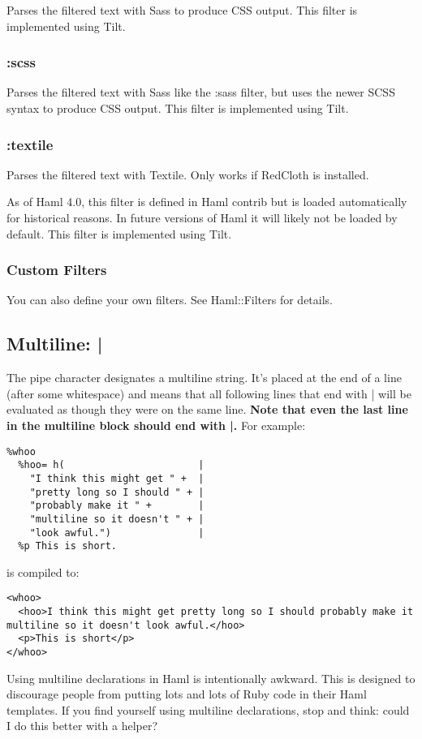 \documentclass[10pt]{article}
\begin{document}
 Parses the filtered text with Sass to produce CSS output. This filter is implemented using Tilt.
\subsubsection*{:scss}


 Parses the filtered text with Sass like the :sass filter, but uses the newer SCSS syntax to produce CSS output. This filter is implemented using Tilt.
\subsubsection*{:textile}


 Parses the filtered text with Textile. Only works if RedCloth is installed.


 As of Haml 4.0, this filter is defined in Haml contrib but is loaded automatically for historical reasons. In future versions of Haml it will likely not be loaded by default. This filter is implemented using Tilt.
\subsubsection*{Custom Filters}


 You can also define your own filters. See Haml::Filters for details.
\subsection*{Multiline: |}


 The pipe character designates a multiline string. It’s placed at the end of a line (after some whitespace) and means that all following lines that end with | will be evaluated as though they were on the same line. \textbf{Note that even the last line in the multiline block should end with |.}
 For example:
\begin{verbatim}
%whoo
  %hoo= h(                       |
    "I think this might get " +  |
    "pretty long so I should " + |
    "probably make it " +        |
    "multiline so it doesn't " + |
    "look awful.")               |
  %p This is short.
\end{verbatim}


 is compiled to:
\begin{verbatim}
<whoo>
  <hoo>I think this might get pretty long so I should probably make it multiline so it doesn't look awful.</hoo>
  <p>This is short</p>
</whoo>
\end{verbatim}


 Using multiline declarations in Haml is intentionally awkward. This is designed to discourage people from putting lots and lots of Ruby code in their Haml templates. If you find yourself using multiline declarations, stop and think: could I do this better with a helper?
\end{document}
